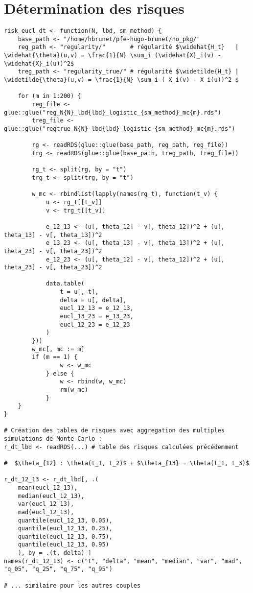 \section{Détermination des risques}

\begin{verbatim}
risk_eucl_dt <- function(N, lbd, sm_method) {
    base_path <- "/home/hbrunet/pfe-hugo-brunet/no_pkg/"
    reg_path <- "regularity/"       # régularité $\widehat{H_t}   | \widehat{\theta}(u,v) = \frac{1}{N} \sum_i (\widehat{X}_i(v) - \widehat{X}_i(u))^2$
    treg_path <- "regularity_true/" # régularité $\widetilde{H_t} | \widetilde{\theta}(u,v) = \frac{1}{N} \sum_i ( X_i(v) - X_i(u))^2 $

    for (m in 1:200) {
        reg_file <- glue::glue("reg_N{N}_lbd{lbd}_logistic_{sm_method}_mc{m}.rds")
        treg_file <- glue::glue("regtrue_N{N}_lbd{lbd}_logistic_{sm_method}_mc{m}.rds")

        rg <- readRDS(glue::glue(base_path, reg_path, reg_file))
        trg <- readRDS(glue::glue(base_path, treg_path, treg_file))

        rg_t <- split(rg, by = "t")
        trg_t <- split(trg, by = "t")

        w_mc <- rbindlist(lapply(names(rg_t), function(t_v) {
            u <- rg_t[[t_v]]
            v <- trg_t[[t_v]]

            e_12_13 <- (u[, theta_12] - v[, theta_12])^2 + (u[, theta_13] - v[, theta_13])^2
            e_13_23 <- (u[, theta_13] - v[, theta_13])^2 + (u[, theta_23] - v[, theta_23])^2
            e_12_23 <- (u[, theta_12] - v[, theta_12])^2 + (u[, theta_23] - v[, theta_23])^2

            data.table(
                t = u[, t],
                delta = u[, delta],
                eucl_12_13 = e_12_13,
                eucl_13_23 = e_13_23,
                eucl_12_23 = e_12_23
            )
        }))
        w_mc[, mc := m]
        if (m == 1) {
                w <- w_mc
            } else {
                w <- rbind(w, w_mc)
                rm(w_mc)
            }
    }
}

# Création des tables de risques avec aggregation des multiples simulations de Monte-Carlo :
r_dt_lbd <- readRDS(...) # table des risques calculées précédemment

#  $\theta_{12} : \theta(t_1, t_2)$ + $\theta_{13} = \theta(t_1, t_3)$

r_dt_12_13 <- r_dt_lbd[, .(
    mean(eucl_12_13), 
    median(eucl_12_13), 
    var(eucl_12_13), 
    mad(eucl_12_13), 
    quantile(eucl_12_13, 0.05), 
    quantile(eucl_12_13, 0.25), 
    quantile(eucl_12_13, 0.75), 
    quantile(eucl_12_13, 0.95)
    ), by = .(t, delta) ]
names(r_dt_12_13) <- c("t", "delta", "mean", "median", "var", "mad", "q_05", "q_25", "q_75", "q_95")

# ... similaire pour les autres couples
\end{verbatim}

